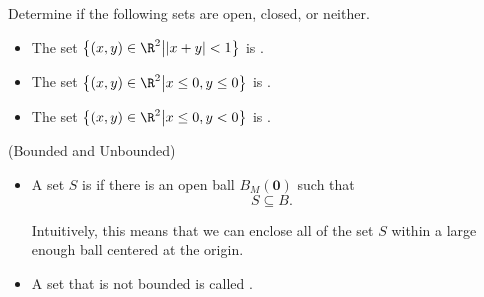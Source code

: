 \documentclass{ximera}
\newcommand{\pt}[1]{\mathbf{#1}} %
\begin{document}
\begin{question}
Determine if the following sets are open, closed, or neither.

\begin{itemize}
\item The set $\left\{ (x,y) \in \R^2 \big| |x+y| < 1 \right\}$ is .
\item The set $\left\{ (x,y) \in \R^2 \big| x \leq 0 , y \leq 0 \right\}$ is .
\item The set $\left\{ (x,y) \in \R^2 \big| x \leq 0 , y<0\right\}$ is .
\end{itemize}
\end{question}

 
 \begin{definition}   (Bounded and Unbounded) 

      \begin{itemize}
  \item A set $S$ is  if there is an open ball $B_M(\pt{0})$ such that
    \[
    S\subseteq B.
    \]
    
    Intuitively, this means that we can enclose all of the set $S$ within a large enough ball centered at the origin.
    
    \item A set that is not bounded is called .
  \end{itemize}

\end{definition}
\end{document}
